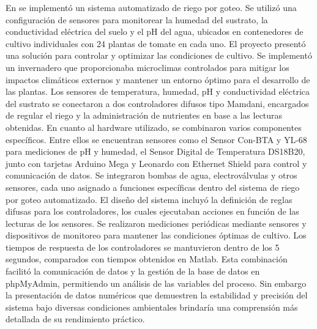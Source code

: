 \bigbreak
En \cite{lema_holguin_implementacion_2018} se implementó un sistema automatizado de riego por goteo. Se utilizó una configuración de sensores para monitorear la humedad del sustrato, la conductividad eléctrica del suelo y el pH del agua, ubicados en contenedores de cultivo individuales con 24 plantas de tomate en cada uno. El proyecto presentó una solución para controlar y optimizar las condiciones de cultivo. Se implementó un invernadero que proporcionaba microclimas controlados para mitigar los impactos climáticos externos y mantener un entorno óptimo para el desarrollo de las plantas. Los sensores de temperatura, humedad, pH y conductividad eléctrica del sustrato se conectaron a dos controladores difusos tipo Mamdani, encargados de regular el riego y la administración de nutrientes en base a las lecturas obtenidas. En cuanto al hardware utilizado, se combinaron varios componentes específicos. Entre ellos se encuentran sensores como el Sensor Con-BTA y YL-68 para mediciones de pH y humedad, el Sensor Digital de Temperatura DS18B20, junto con tarjetas Arduino Mega y Leonardo con Ethernet Shield para control y comunicación de datos. Se integraron bombas de agua, electroválvulas y otros sensores, cada uno asignado a funciones específicas dentro del sistema de riego por goteo automatizado. El diseño del sistema incluyó la definición de reglas difusas para los controladores, los cuales ejecutaban acciones en función de las lecturas de los sensores. Se realizaron mediciones periódicas mediante sensores y dispositivos de monitoreo para mantener las condiciones óptimas de cultivo. Los tiempos de respuesta de los controladores se mantuvieron dentro de los 5 segundos, comparados con tiempos obtenidos en Matlab. Esta combinación facilitó la comunicación de datos y la gestión de la base de datos en phpMyAdmin, permitiendo un análisis de las variables del proceso. Sin embargo la presentación de datos numéricos que demuestren la estabilidad y precisión del sistema bajo diversas condiciones ambientales brindaría una comprensión más detallada de su rendimiento práctico.

